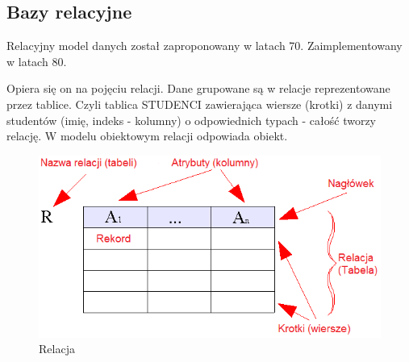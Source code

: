\documentclass[a4paper,twoside]{report}
\begin{document}
\subsection{Bazy relacyjne}
Relacyjny model danych został zaproponowany w latach 70. Zaimplementowany w latach 80. 

Opiera się on na pojęciu relacji. Dane grupowane są w relacje reprezentowane przez tablice. Czyli tablica STUDENCI zawierająca wiersze (krotki) z danymi studentów (imię, indeks - kolumny) o odpowiednich typach - całość tworzy relację.
W modelu obiektowym relacji odpowiada obiekt. \\

\begin{figure}[htbp]
	\centering
	\includegraphics[scale=0.7]{obrazy/bazy/Relational_model_concepts_PL.png}
	\caption{Relacja}
\end{figure}
\end{document}
